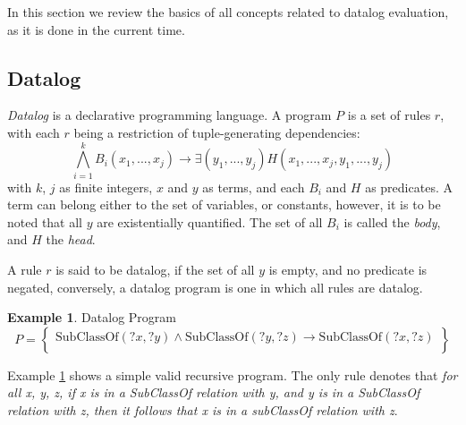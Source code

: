 \documentclass[sigconf,screen,review,natbib]{acmart}
\theoremstyle{definition}
\newtheorem{exmp}{Example}[section]
\begin{document}
In this section we review the basics of all concepts related to datalog evaluation, as it is done in the current time.

\subsection{Datalog}

\textit{Datalog}\cite{datalog} is a declarative programming language. A program $P$ is a set of
rules $r$, with each $r$ being a restriction of tuple-generating dependencies: \[\bigwedge_{i=1}^kB_i(x_1, ..., x_j) \rightarrow \exists (y_1, ..., y_j)H(x_1, ..., x_j, y_1, ..., y_j)\]
with $k$, $j$ as finite integers, $x$ and $y$ as terms, and each $B_i$ and $H$ as predicates. A term can belong
either to the set of variables, or constants, however, it is to be noted that all $y$ are existentially quantified.
The set of all $B_i$ is called the \textit{body}, and $H$ the \textit{head}.

A rule $r$ is said to be datalog, if the set of all $y$ is empty, and no predicate is negated, conversely, a
datalog program is one in which all rules are datalog.
\begin{exmp}{Datalog Program}\label{ex1}
	\[
		P = \left\{  \begin{array}{l}
			\text{SubClassOf}(?x, ?y) \wedge \text{SubClassOf}(?y, ?z) \rightarrow \text{SubClassOf}(?x, ?z) \\
		\end{array}\right\}
	\]
\end{exmp}
Example \ref{ex1} shows a simple valid recursive program. The only rule denotes that \textit{for all x, y, z, if x is
	in a SubClassOf relation with y, and y is in a SubClassOf relation with z, then it follows that x is in a subClassOf
	relation with z}.
\end{document}
